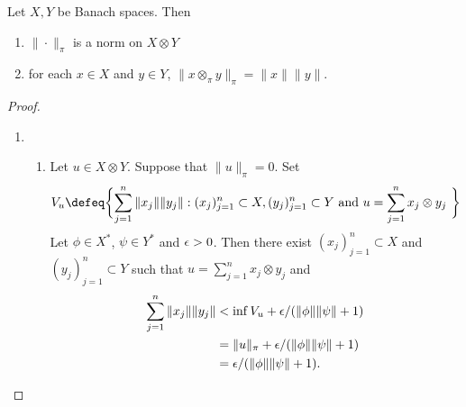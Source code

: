 \documentclass{book}
\begin{document}
\begin{ex}
	Let $X, Y$ be Banach spaces. Then 
	\begin{enumerate}
		\item $\| \cdot \|_{\pi}$ is a norm on $X \otimes Y$
		\item for each $x \in X$ and $y \in Y$, $\|x \otimes_{\pi} y \|_{\pi} = \|x\|\|y\|$.
	\end{enumerate}
\end{ex}

\begin{proof}\
	\begin{enumerate}
		\item 
		\begin{enumerate}
			\item Let $u \in X \otimes Y$. Suppose that $\|u\|_{\pi} = 0$. Set 
			$$V_u \defeq \bigg\{ \text{$\sum_{j=1}^n \|x_j\| \|y_j\| : (x_j)_{j=1}^n \subset X, (y_j)_{j=1}^n \subset Y $ and $u = \sum_{j=1}^n x_j \otimes y_j$ }\bigg\}$$ 
			Let $\phi \in X^*$, $\psi \in Y^*$ and $\epsilon > 0$. Then there exist $(x_j)_{j=1}^n \subset X$ and $(y_j)_{j=1}^n \subset Y$ such that $u = \sum\limits_{j=1}^n x_j \otimes y_j$ and  
			\begin{align*}
				\sum\limits_{j=1}^n \|x_j\| \|y_j\| 
				& < \inf V_u + \epsilon/(\|\phi\|\|\psi\| + 1) \\
				& = \|u\|_{\pi} + \epsilon/(\|\phi\|\|\psi\| + 1) \\
				& = \epsilon/(\|\phi\|\|\psi\| + 1).
			\end{align*}
			

\end{enumerate}
\end{enumerate}
\end{proof}
\end{document}
